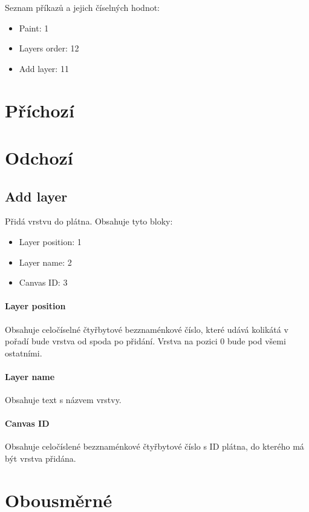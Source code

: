 \documentclass[12pt,oneside,a4paper]{report}
\begin{document}
Seznam příkazů a jejich číselných hodnot:

\begin{itemize}
	\item Paint: 1
	\item Layers order: 12
	\item Add layer: 11
\end{itemize}

\section{Příchozí}

\section{Odchozí}

\subsection{Add layer}

Přidá vrstvu do plátna. Obsahuje tyto bloky:

\begin{itemize}
	\item Layer position: 1
	\item Layer name: 2
	\item Canvas ID: 3
\end{itemize}

\paragraph{Layer position}
Obsahuje celočíselné čtyřbytové bezznaménkové číslo, které udává kolikátá v pořadí bude vrstva od spoda po přidání. Vrstva na pozici $0$ bude pod všemi ostatními.

\paragraph{Layer name}
Obsahuje text s názvem vrstvy.

\paragraph{Canvas ID}
Obsahuje celočíslené bezznaménkové čtyřbytové číslo s ID plátna, do kterého má být vrstva přidána.

\section{Obousměrné}
\end{document}
